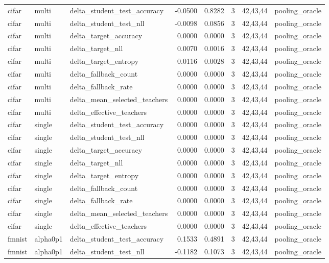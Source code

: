 \begin{tabular}{lllrrrll}
cifar & multi & delta\_student\_test\_accuracy & -0.0500 & 0.8282 & 3 & 42,43,44 & pooling\_oracle \\
cifar & multi & delta\_student\_test\_nll & -0.0098 & 0.0856 & 3 & 42,43,44 & pooling\_oracle \\
cifar & multi & delta\_target\_accuracy & 0.0000 & 0.0000 & 3 & 42,43,44 & pooling\_oracle \\
cifar & multi & delta\_target\_nll & 0.0070 & 0.0016 & 3 & 42,43,44 & pooling\_oracle \\
cifar & multi & delta\_target\_entropy & 0.0116 & 0.0028 & 3 & 42,43,44 & pooling\_oracle \\
cifar & multi & delta\_fallback\_count & 0.0000 & 0.0000 & 3 & 42,43,44 & pooling\_oracle \\
cifar & multi & delta\_fallback\_rate & 0.0000 & 0.0000 & 3 & 42,43,44 & pooling\_oracle \\
cifar & multi & delta\_mean\_selected\_teachers & 0.0000 & 0.0000 & 3 & 42,43,44 & pooling\_oracle \\
cifar & multi & delta\_effective\_teachers & 0.0000 & 0.0000 & 3 & 42,43,44 & pooling\_oracle \\
cifar & single & delta\_student\_test\_accuracy & 0.0000 & 0.0000 & 3 & 42,43,44 & pooling\_oracle \\
cifar & single & delta\_student\_test\_nll & 0.0000 & 0.0000 & 3 & 42,43,44 & pooling\_oracle \\
cifar & single & delta\_target\_accuracy & 0.0000 & 0.0000 & 3 & 42,43,44 & pooling\_oracle \\
cifar & single & delta\_target\_nll & 0.0000 & 0.0000 & 3 & 42,43,44 & pooling\_oracle \\
cifar & single & delta\_target\_entropy & 0.0000 & 0.0000 & 3 & 42,43,44 & pooling\_oracle \\
cifar & single & delta\_fallback\_count & 0.0000 & 0.0000 & 3 & 42,43,44 & pooling\_oracle \\
cifar & single & delta\_fallback\_rate & 0.0000 & 0.0000 & 3 & 42,43,44 & pooling\_oracle \\
cifar & single & delta\_mean\_selected\_teachers & 0.0000 & 0.0000 & 3 & 42,43,44 & pooling\_oracle \\
cifar & single & delta\_effective\_teachers & 0.0000 & 0.0000 & 3 & 42,43,44 & pooling\_oracle \\
fmnist & alpha0p1 & delta\_student\_test\_accuracy & 0.1533 & 0.4891 & 3 & 42,43,44 & pooling\_oracle \\
fmnist & alpha0p1 & delta\_student\_test\_nll & -0.1182 & 0.1073 & 3 & 42,43,44 & pooling\_oracle \\

\end{tabular}
